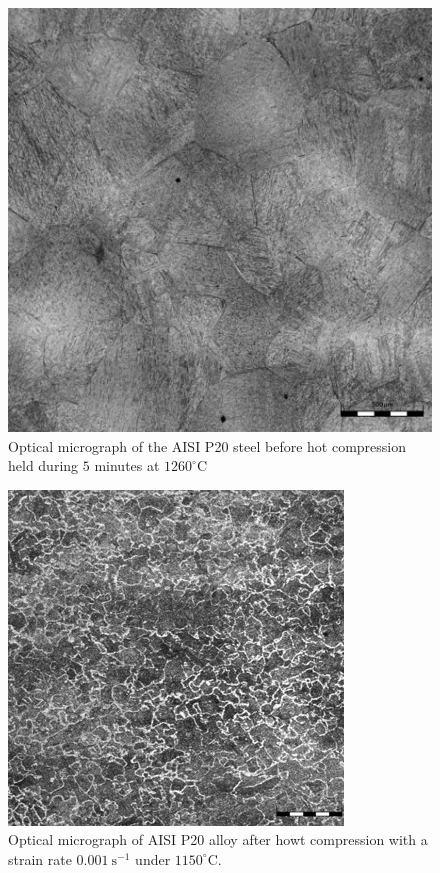 \documentclass[twoside,english,1p,final,sort&compress]{elsarticle}
\theoremstyle{plain}
\begin{document}
\begin{figure}[!ht]
\centering
\includegraphics[width=0.9\columnwidth]
{newFigures/BeforeCompM}
\caption{Optical micrograph of the AISI P20 steel before hot compression held during $5$ minutes at $1260^\circ$C}
\label{fig:BeforeCompM}
\end{figure}
\begin{figure}[!ht]
\centering
\includegraphics[width=0.9\columnwidth]
{newFigures/AfterCompM}
\caption{Optical micrograph of AISI P20 alloy after howt compression with a strain rate $0.001\ \text{s}^{-1}$ under $1150^\circ$C.}
\label{fig:AfterCompM}
\end{figure}
\end{document}
